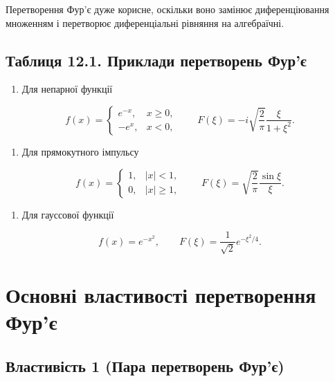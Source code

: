 \documentclass[
  ukrainian,
]{article}
\providecommand{\tightlist}{%
  \setlength{\itemsep}{0pt}\setlength{\parskip}{0pt}}
\begin{document}
Перетворення Фур'є дуже корисне, оскільки воно замінює диференціювання
множенням і перетворює диференціальні рівняння на алгебраїчні.

\subsection{Таблиця 12.1. Приклади перетворень
Фур'є}\label{ux442ux430ux431ux43bux438ux446ux44f-12.1.-ux43fux440ux438ux43aux43bux430ux434ux438-ux43fux435ux440ux435ux442ux432ux43eux440ux435ux43dux44c-ux444ux443ux440ux454}

\begin{enumerate}
\def\labelenumi{\arabic{enumi}.}
\tightlist
\item
  Для непарної функції
\end{enumerate}

\[
f(x)=
\begin{cases}
e^{-x}, & x\ge 0,\\
-e^{x}, & x<0,
\end{cases}
\qquad F(\xi)=-i\sqrt{\frac{2}{\pi}}\frac{\xi}{1+\xi^2}.
\]

\begin{enumerate}
\def\labelenumi{\arabic{enumi}.}
\setcounter{enumi}{1}
\tightlist
\item
  Для прямокутного імпульсу
\end{enumerate}

\[
f(x)=
\begin{cases}
1, & |x|<1,\\
0, & |x|\ge 1,
\end{cases}
\qquad F(\xi)=\sqrt{\frac{2}{\pi}}\frac{\sin\xi}{\xi}.
\]

\begin{enumerate}
\def\labelenumi{\arabic{enumi}.}
\setcounter{enumi}{2}
\tightlist
\item
  Для гауссової функції
\end{enumerate}

\[
f(x)=e^{-x^2},
\qquad F(\xi)=\frac{1}{\sqrt{2}}e^{-\xi^2/4}.
\]

\section{Основні властивості перетворення
Фур'є}\label{ux43eux441ux43dux43eux432ux43dux456-ux432ux43bux430ux441ux442ux438ux432ux43eux441ux442ux456-ux43fux435ux440ux435ux442ux432ux43eux440ux435ux43dux43dux44f-ux444ux443ux440ux454}

\subsection{Властивість 1 (Пара перетворень
Фур'є)}\label{ux432ux43bux430ux441ux442ux438ux432ux456ux441ux442ux44c-1-ux43fux430ux440ux430-ux43fux435ux440ux435ux442ux432ux43eux440ux435ux43dux44c-ux444ux443ux440ux454}
\end{document}
